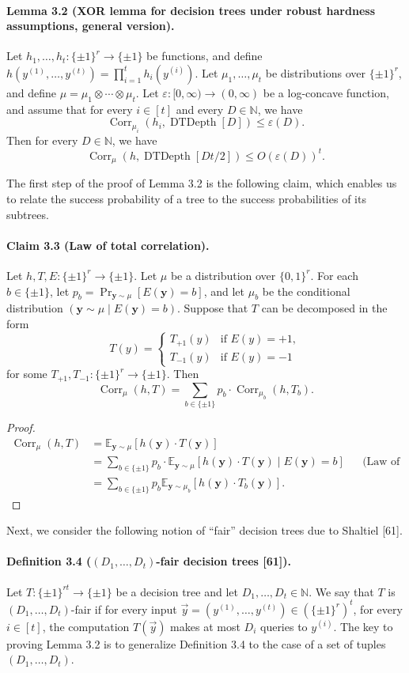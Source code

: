 \documentclass[10pt,a4paper]{article}
\newcommand{\Corr}{\operatorname{Corr}}
\newcommand{\DT}{\operatorname{DTDepth}}
\begin{document}
\paragraph{Lemma 3.2 (XOR lemma for decision trees under robust hardness assumptions, general version).}
Let $h_1,\ldots,h_t:\{\pm1\}^r\to\{\pm1\}$ be functions, and define $h(y^{(1)},\ldots,y^{(t)})=\prod_{i=1}^t h_i(y^{(i)})$. Let $\mu_1,\ldots,\mu_t$ be distributions over $\{\pm1\}^r$, and define $\mu=\mu_1\otimes\cdots\otimes\mu_t$. Let $\varepsilon:[0,\infty)\to(0,\infty)$ be a log-concave function, and assume that for every $i\in[t]$ and every $D\in\mathbb N$, we have
\[\Corr_{\mu_i}(h_i,\DT[D])\le\varepsilon(D).\]
Then for every $D\in\mathbb N$, we have
\[\Corr_\mu(h,\DT[Dt/2])\le O(\varepsilon(D))^t.\]

The first step of the proof of Lemma 3.2 is the following claim, which enables us to relate the success probability of a tree to the success probabilities of its subtrees.
\paragraph{Claim 3.3 (Law of total correlation).} Let $h,T,E:\{\pm1\}^r\to\{\pm1\}$. Let $\mu$ be a distribution over $\{0,1\}^r$. For each $b\in\{\pm1\}$, let $p_b=\Pr_{\mathbf y\sim\mu}[E(\mathbf y)=b]$, and let $\mu_b$ be the conditional distribution $(\mathbf y\sim\mu\mid E(\mathbf y)=b)$. Suppose that $T$ can be decomposed in the form
\[T(y)=\begin{cases}T_{+1}(y)&\text{if }E(y)=+1,\\T_{-1}(y)&\text{if }E(y)=-1\end{cases}\]
for some $T_{+1},T_{-1}:\{\pm1\}^r\to\{\pm1\}$. Then
\[\Corr_\mu(h,T)=\sum_{b\in\{\pm1\}}p_b\cdot\Corr_{\mu_b}(h,T_b).\]
\begin{proof}
\begin{align*}
\Corr_\mu(h,T)&=\mathbb E_{\mathbf y\sim\mu}[h(\mathbf y)\cdot T(\mathbf y)]\\
&=\sum_{b\in\{\pm1\}}p_b\cdot\mathbb E_{\mathbf y\sim\mu}[h(\mathbf y)\cdot T(\mathbf y)\mid E(\mathbf y)=b] &&\text{(Law of total expectation)}\\
&=\sum_{b\in\{\pm1\}}p_b\mathbb E_{\mathbf y\sim\mu_b}[h(\mathbf y)\cdot T_b(\mathbf y)].
\end{align*}
\end{proof}
Next, we consider the following notion of ``fair'' decision trees due to Shaltiel [61].
\paragraph{Definition 3.4 ($(D_1,\ldots,D_t)$-fair decision trees [61]).} Let $T:\{\pm1\}^{rt}\to\{\pm1\}$ be a decision tree and let $D_1,\ldots,D_t\in\mathbb N$. We say that $T$ is $(D_1,\ldots,D_t)$-fair if for every input $\vec y=(y^{(1)},\ldots,y^{(t)})\in(\{\pm1\}^r)^t$, for every $i\in[t]$, the computation $T(\vec y)$ makes at most $D_i$ queries to $y^{(i)}$.
The key to proving Lemma 3.2 is to generalize Definition 3.4 to the case of a set of tuples $(D_1,\ldots,D_t)$.
\end{document}
